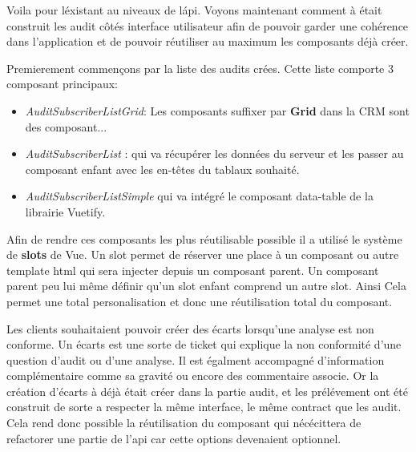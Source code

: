 Voila pour l\'existant au niveaux de l\'api. Voyons maintenant comment à était construit les audit côtés interface utilisateur afin de pouvoir garder une cohérence dans l'application et de pouvoir réutiliser au maximum les composants déjà créer. 

Premierement commençons par la liste des audits crées. Cette liste comporte 3 composant principaux: 
\begin{itemize}
    \item  \textit{AuditSubscriberListGrid}: Les composants suffixer par \textbf{Grid} dans la CRM sont des composant... 
    \item \textit{AuditSubscriberList} : qui va récupérer les données du serveur et les passer au composant enfant avec les en-têtes du tablaux souhaité.  
    \item \textit{AuditSubscriberListSimple} qui va intégré le composant data-table de la librairie Vuetify. 
\end{itemize}

Afin de rendre ces composants les plus réutilisable possible il a utilisé le système de \textbf{slots}\cite{vueslots} de Vue. Un slot permet de réserver une place à un composant ou autre template html qui sera injecter depuis un composant parent. Un composant parent peu lui même définir qu'un slot enfant comprend un autre slot. Ainsi Cela permet une total personalisation et donc une réutilisation total du composant. 

Les clients souhaitaient pouvoir créer des écarts lorsqu'une analyse est non conforme.
Un écarts est une sorte de ticket qui explique la non conformité d'une question d'audit ou d'une analyse. Il est égalment accompagné d'information complémentaire comme sa gravité ou encore des commentaire associe. Or la création d'écarts à déjà était créer dans la partie audit, et les prélévement ont été construit de sorte a respecter la même interface, le même contract que les audit. Cela rend donc possible la  réutilisation du composant qui nécécittera de refactorer une partie de l'api car cette options devenaient optionnel. 

